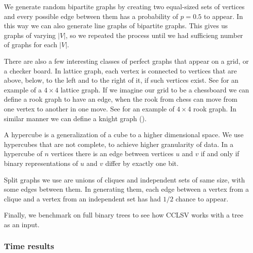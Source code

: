 
We generate random bipartite graphs by creating two equal-sized sets of vertices and every possible edge between them has a probability of $p = 0.5$ to appear. In this way we can also generate line graphs of bipartite graphs. This gives us graphs of varying $|V|$, so we repeated the process until we had sufficieng number of graphs for each $|V|$.

There are also a few interesting classes of perfect graphs that appear on a grid, or a checker board. In lattice graph, each vertex is connected to vertices that are above, below, to the left and to the right of it, if such vertices exist. See  for an example of a $4 \times 4$ lattice graph. If we imagine our grid to be a chessboard we can define a rook graph to have an edge, when the rook from chess can move from one vertex to another in one move. See  for an example of $4 \times 4$ rook graph. In similar manner we can define a knight graph ().

A hypercube is a generalization of a cube to a higher dimensional space. We use hypercubes that are not complete, to achieve higher granularity of data. In a hypercube of $n$ vertices there is an edge between vertices $u$ and $v$ if and only if binary representations of $u$ and $v$ differ by exactly one bit.

Split graphs we use are unions of cliques and independent sets of same size, with some edges between them. In generating them, each edge between a vertex from a clique and a vertex from an independent set has had $1/2$ chance to appear.

Finally, we benchmark on full binary trees to see how CCLSV works with a tree as an input.

\subsubsection{Time results}

